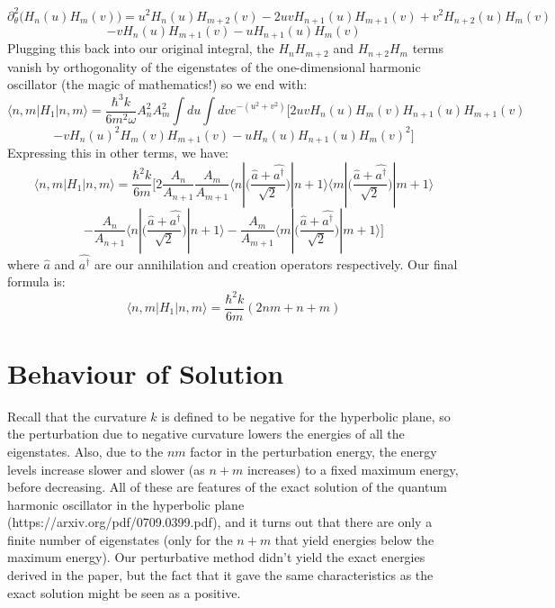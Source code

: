 \documentclass[12pt]{article}
\begin{document}
$$\partial_\theta^2 \bigg( H_n(u) H_m(v) \bigg) = u^2 H_n(u) H_{m+2}(v) -2uvH_{n+1}(u)H_{m+1}(v) + v^2 H_{n+2}(u) H_m(v)$$
$$-vH_n(u)H_{m+1}(v) -u H_{n+1}(u) H_m (v)$$
Plugging this back into our original integral, the $H_n H_{m+2}$ and $H_{n+2}H_m$ terms vanish by orthogonality of the eigenstates of the one-dimensional harmonic oscillator (the magic of mathematics!) so we end with:
$$\langle n,m | H_1 | n,m \rangle =  \frac{\hbar^3 k }{6m^2 \omega} A_n^2 A_m^2 \int du \int dv e^{-(u^2 + v^2)} \bigg[ 2uv H_n(u) H_m(v) H_{n+1}(u) H_{m+1}(v)$$
$$-v H_n(u)^2 H_m(v) H_{m+1}(v) -u H_n(u) H_{n+1}(u) H_m(v)^2 \bigg]$$
Expressing this in other terms, we have:
$$\langle n,m | H_1 | n,m \rangle =  \frac{\hbar^2 k}{6 m} \bigg[ 2 \frac{A_n}{A_{n+1}} \frac{A_m}{A_{m+1}} \langle n | \bigg( \frac{\hat{a} + \hat{a^{\dagger}}}{\sqrt{2}} \bigg) | n+1 \rangle \langle m | \bigg( \frac{\hat{a} + \hat{a^{\dagger}}}{\sqrt{2}} \bigg) | m+1 \rangle$$
$$- \frac{A_n}{A_{n+1}} \langle n | \bigg( \frac{\hat{a} + \hat{a^{\dagger}}}{\sqrt{2}} \bigg) | n+1 \rangle - \frac{A_m}{A_{m+1}} \langle m | \bigg( \frac{\hat{a} + \hat{a^{\dagger}}}{\sqrt{2}} \bigg) | m+1 \rangle \bigg]  $$
where $\hat{a}$ and $\hat{a^{\dagger}}$ are our annihilation and creation operators respectively. Our final formula is:
$$\langle n,m | H_1 | n,m \rangle =  \frac{\hbar^2 k}{6 m} (2nm+n+m)$$

\section{Behaviour of Solution}

Recall that the curvature $k$ is defined to be negative for the hyperbolic plane, so the perturbation due to negative curvature lowers the energies of all the eigenstates. Also, due to the $nm$ factor in the perturbation energy, the energy levels increase slower and slower (as $n+m$ increases) to a fixed maximum energy, before decreasing. All of these are features of the exact solution of the quantum harmonic oscillator in the hyperbolic plane (https://arxiv.org/pdf/0709.0399.pdf), and it turns out that there are only a finite number of eigenstates (only for the $n+m$ that yield energies below the maximum energy). Our perturbative method didn't yield the exact energies derived in the paper, but the fact that it gave the same characteristics as the exact solution might be seen as a positive.  
\end{document}
